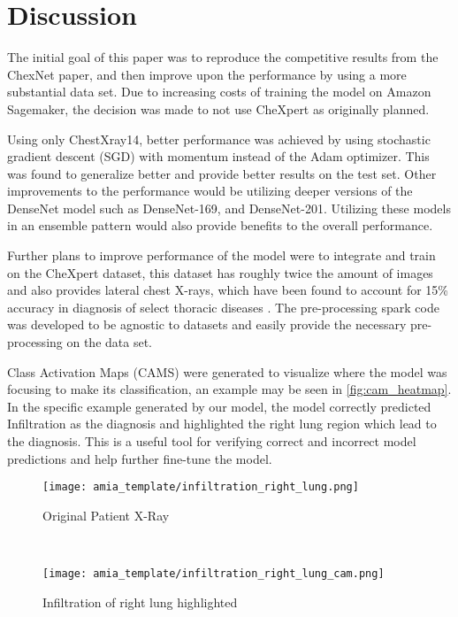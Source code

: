 \documentclass{amia}
\begin{document}
\section*{Discussion}

The initial goal of this paper was to reproduce the competitive results from the ChexNet paper, and then improve upon the performance by using a more substantial data set. Due to increasing costs of training the model on Amazon Sagemaker, the decision was made to not use CheXpert as originally planned.

Using only ChestXray14, better performance was achieved by using stochastic gradient descent (SGD) with momentum instead of the Adam optimizer. This was found to generalize better \cite{ref13} and provide better results on the test set. Other improvements to the performance would be utilizing deeper versions of the DenseNet model such as DenseNet-169, and DenseNet-201. Utilizing these models in an ensemble pattern would also provide benefits to the overall performance.

Further plans to improve performance of the model were to integrate and train on the CheXpert dataset, this dataset has roughly twice the amount of images and also provides lateral chest X-rays, which have been found to account for 15\% accuracy in diagnosis of select thoracic diseases \cite{ref10}. The pre-processing spark code was developed to be agnostic to datasets and easily provide the necessary pre-processing on the data set.

Class Activation Maps (CAMS)\cite{ref11} were generated to visualize where the model was focusing to make its classification, an example may be seen in \ref{fig:cam_heatmap}. In the specific example generated by our model, the model correctly predicted Infiltration as the diagnosis and highlighted the right lung region which lead to the diagnosis. This is a useful tool for verifying correct and incorrect model predictions and help further fine-tune the model.
\\

\begin{figure*}[!htb]
    \centering
    \begin{subfigure}[t]{0.5\textwidth}
        \centering
        \texttt{[image: amia\_template/infiltration\_right\_lung.png]}
        \caption{Original Patient X-Ray}
    \end{subfigure}%
    ~
    \begin{subfigure}[t]{0.5\textwidth}
        \centering
        \texttt{[image: amia\_template/infiltration\_right\_lung\_cam.png]}
        \caption{Infiltration of right lung highlighted}
    \end{subfigure}
    \caption{Patient X-Ray \& CAM Heatmap}
\label{fig:cam_heatmap}
\end{figure*}
\end{document}
